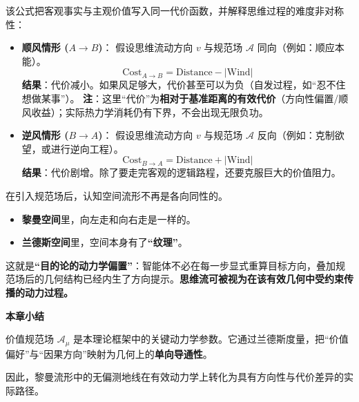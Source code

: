 
该公式把客观事实与主观价值写入同一代价函数，并解释思维过程的难度非对称性：

\begin{itemize}
    \item \textbf{顺风情形 ($A \to B$)}：
    假设思维流动方向 $v$ 与规范场 $\mathcal{A}$ 同向（例如：顺应本能）。
    $$ \text{Cost}_{A \to B} = \text{Distance} - |\text{Wind}| $$
    \textbf{结果}：代价减小。如果风足够大，代价甚至可以为负（自发过程，如“忍不住想做某事”）。
    \textbf{注}：这里“代价”为\textbf{相对于基准距离的有效代价}（方向性偏置/顺风收益）；实际热力学消耗仍有下界，不会出现无限负功。

    \item \textbf{逆风情形 ($B \to A$)}：
    假设思维流动方向 $v$ 与规范场 $\mathcal{A}$ 反向（例如：克制欲望，或进行逆向工程）。
    $$ \text{Cost}_{B \to A} = \text{Distance} + |\text{Wind}| $$
    \textbf{结果}：代价剧增。除了要走完客观的逻辑路程，还要克服巨大的价值阻力。
\end{itemize}


在引入规范场后，认知空间流形不再是各向同性的。
\begin{itemize}
    \item   \textbf{黎曼空间}里，向左走和向右走是一样的。
    \item   \textbf{兰德斯空间}里，空间本身有了\textbf{“纹理”}。
\end{itemize}

这就是\textbf{“目的论的动力学偏置”}：智能体不必在每一步显式重算目标方向，叠加规范场后的几何结构已经内生了方向提示。\textbf{思维流可被视为在该有效几何中受约束传播的动力过程。}

\begin{bquote}
    \textbf{本章小结}

    价值规范场 $\mathcal{A}_\mu$ 是本理论框架中的关键动力学参数。它通过兰德斯度量，把“价值偏好”与“因果方向”映射为几何上的\textbf{单向导通性}。

    因此，黎曼流形中的无偏测地线在有效动力学上转化为具有方向性与代价差异的实际路径。
\end{bquote}

